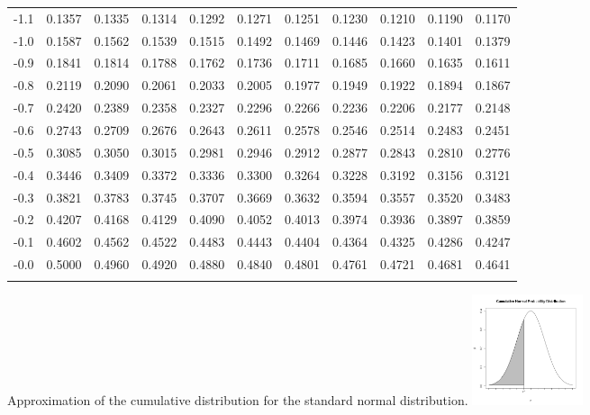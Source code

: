 \begin{tabular}{l|llllllllll}
-1.1 & 0.1357 & 0.1335 & 0.1314 & 0.1292 & 0.1271 & 0.1251 & 0.1230 & 0.1210 & 0.1190 & 0.1170 \\\arrayrulecolor{light-gray}\hline\arrayrulecolor{black} 
-1.0 & 0.1587 & 0.1562 & 0.1539 & 0.1515 & 0.1492 & 0.1469 & 0.1446 & 0.1423 & 0.1401 & 0.1379 \\\arrayrulecolor{light-gray}\hline\arrayrulecolor{black} 
-0.9 & 0.1841 & 0.1814 & 0.1788 & 0.1762 & 0.1736 & 0.1711 & 0.1685 & 0.1660 & 0.1635 & 0.1611 \\\arrayrulecolor{light-gray}\hline\arrayrulecolor{black} 
-0.8 & 0.2119 & 0.2090 & 0.2061 & 0.2033 & 0.2005 & 0.1977 & 0.1949 & 0.1922 & 0.1894 & 0.1867 \\\arrayrulecolor{light-gray}\hline\arrayrulecolor{black} 
-0.7 & 0.2420 & 0.2389 & 0.2358 & 0.2327 & 0.2296 & 0.2266 & 0.2236 & 0.2206 & 0.2177 & 0.2148 \\\arrayrulecolor{light-gray}\hline\arrayrulecolor{black} 
-0.6 & 0.2743 & 0.2709 & 0.2676 & 0.2643 & 0.2611 & 0.2578 & 0.2546 & 0.2514 & 0.2483 & 0.2451 \\\arrayrulecolor{light-gray}\hline\arrayrulecolor{black} 
-0.5 & 0.3085 & 0.3050 & 0.3015 & 0.2981 & 0.2946 & 0.2912 & 0.2877 & 0.2843 & 0.2810 & 0.2776 \\\arrayrulecolor{light-gray}\hline\arrayrulecolor{black} 
-0.4 & 0.3446 & 0.3409 & 0.3372 & 0.3336 & 0.3300 & 0.3264 & 0.3228 & 0.3192 & 0.3156 & 0.3121 \\\arrayrulecolor{light-gray}\hline\arrayrulecolor{black} 
-0.3 & 0.3821 & 0.3783 & 0.3745 & 0.3707 & 0.3669 & 0.3632 & 0.3594 & 0.3557 & 0.3520 & 0.3483 \\\arrayrulecolor{light-gray}\hline\arrayrulecolor{black} 
-0.2 & 0.4207 & 0.4168 & 0.4129 & 0.4090 & 0.4052 & 0.4013 & 0.3974 & 0.3936 & 0.3897 & 0.3859 \\\arrayrulecolor{light-gray}\hline\arrayrulecolor{black} 
-0.1 & 0.4602 & 0.4562 & 0.4522 & 0.4483 & 0.4443 & 0.4404 & 0.4364 & 0.4325 & 0.4286 & 0.4247 \\\arrayrulecolor{light-gray}\hline\arrayrulecolor{black} 
-0.0 & 0.5000 & 0.4960 & 0.4920 & 0.4880 & 0.4840 & 0.4801 & 0.4761 & 0.4721 & 0.4681 & 0.4641 \\\arrayrulecolor{light-gray}\hline\arrayrulecolor{black} 
\end{tabular}


\clearpage
 Approximation of the cumulative distribution for the standard normal distribution. 
 \hfill\includegraphics[height=3.25cm]{img/cummulativeDist}

